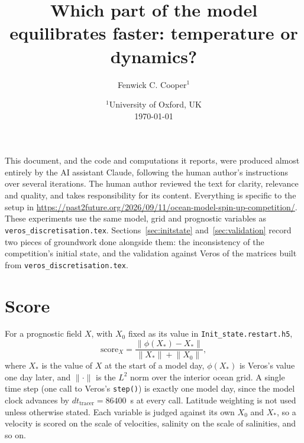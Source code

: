\documentclass{article}
\title{Which part of the model equilibrates faster: temperature or dynamics?}
\author{Fenwick C. Cooper$^1$}
\date{%
    $^1$University of Oxford, UK \\[2ex]
    \today
}
\begin{document}
\maketitle

\tableofcontents

This document, and the code and computations it reports, were produced almost entirely by the AI assistant Claude, following the human author's instructions over several iterations. The human author reviewed the text for clarity, relevance and quality, and takes responsibility for its content. Everything is specific to the setup in \url{https://past2future.org/2026/09/11/ocean-model-spin-up-competition/}.
These experiments use the same model, grid and prognostic variables as \texttt{veros\_discretisation.tex}.
Sections~\ref{sec:initstate} and~\ref{sec:validation} record two pieces of groundwork done alongside them: the inconsistency of the competition's initial state, and the validation against Veros of the matrices built from \texttt{veros\_discretisation.tex}.

\section{Score}\label{sec:score}

For a prognostic field $X$, with $X_0$ fixed as its value in \texttt{Init\_state.restart.h5},
\[
\text{score}_X = \frac{\lVert \phi(X_\ast) - X_\ast \rVert}{\lVert X_\ast \rVert + \lVert X_0 \rVert},
\]
where $X_\ast$ is the value of $X$ at the start of a model day, $\phi(X_\ast)$ is Veros's value one day later, and $\lVert\cdot\rVert$ is the $L^2$ norm over the interior ocean grid. A single time step (one call to Veros's \texttt{step()}) is exactly one model day, since the model clock advances by $dt_\text{tracer}=86400$~s at every call. Latitude weighting is not used unless otherwise stated. Each variable is judged against its own $X_0$ and $X_\ast$, so a velocity is scored on the scale of velocities, salinity on the scale of salinities, and so on.
\end{document}
